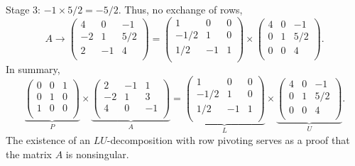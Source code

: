 \documentclass[paper=a4, fontsize=11pt]{scrartcl} %
\numberwithin{equation}{section} %
\numberwithin{figure}{section} %
\numberwithin{table}{section} %
\begin{document}
Stage 3: $-1\times 5/2 = -5/2$. Thus, no exchange of rows,
$$
A \rightarrow
\begin{pmatrix}
4 & 0 & -1 \\
-2 & 1 & 5/2 \\
2 & -1 & 4 \\
\end{pmatrix}
=
\begin{pmatrix}
1 & 0 & 0 \\
-1/2 & 1 & 0 \\
1/2 & -1  & 1 \\
\end{pmatrix}
\times
\begin{pmatrix}
4 & 0 & -1 \\
0 & 1 & 5/2 \\
0 & 0 & 4 \\
\end{pmatrix}.
$$
In summary,
$$
\underbrace{\begin{pmatrix}
0 & 0 & 1 \\
0 & 1 & 0 \\
1 & 0  & 0 \\
\end{pmatrix}}_{P}
\times
\underbrace{\begin{pmatrix}
2 & -1 & 1 \\
-2 & 1 & 3 \\
4 & 0 & -1 \\
\end{pmatrix}}_{A}
=
\underbrace{\begin{pmatrix}
1 & 0 & 0 \\
-1/2 & 1 & 0 \\
1/2 & -1  & 1 \\
\end{pmatrix}}_{L}
\times
\underbrace{\begin{pmatrix}
4 & 0 & -1 \\
0 & 1 & 5/2 \\
0 & 0 & 4 \\
\end{pmatrix}}_{U}.
$$
The existence of an $LU$-decomposition with row pivoting serves as a proof that the matrix $A$ is nonsingular.

\newpage
\end{document}
